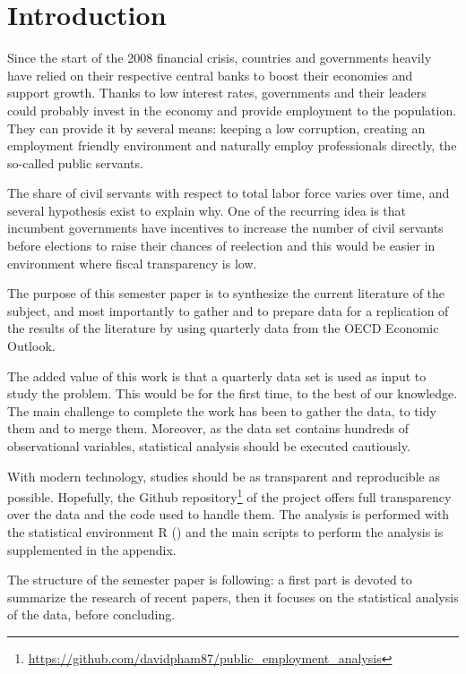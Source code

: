 \chapter{Introduction}

Since the start of the 2008 financial crisis, countries and governments heavily
have relied on their respective central banks to boost their economies and
support growth. Thanks to low interest rates, governments and their leaders
could probably invest in the economy and provide employment to the
population. They can provide it by several means: keeping a low corruption,
creating an employment friendly environment and naturally employ professionals
directly, the so-called public servants.

The share of civil servants with respect to total labor force varies over time,
and several hypothesis exist to explain why. One of the recurring idea is that
incumbent governments have incentives to increase the number of civil servants
before elections to raise their chances of reelection and this would be easier
in environment where fiscal transparency is low.

The purpose of this semester paper is to synthesize the current literature of
the subject, and most importantly to gather and to prepare data for a
replication of the results of the literature by using quarterly data
from the OECD Economic Outlook.

The added value of this work is that a quarterly data set is used as input to
study the problem. This would be for the first time, to the best of our
knowledge. The main challenge to complete the work has been to gather the data,
to tidy them and to merge them. Moreover, as the data set contains hundreds of
observational variables, statistical analysis should be executed cautiously.

With modern technology, studies should be as transparent and reproducible as
possible. Hopefully, the Github
repository\footnote{\url{https://github.com/davidpham87/public_employment_analysis}}
of the project offers full transparency over the data and the code used to
handle them. The analysis is performed with the statistical environment
\textsf{R} (\cite{R2015}) and the main scripts to perform the analysis is supplemented in the
appendix.

The structure of the semester paper is following: a first part is devoted to
summarize the research of recent papers, then it focuses on the statistical
analysis of the data, before concluding.

